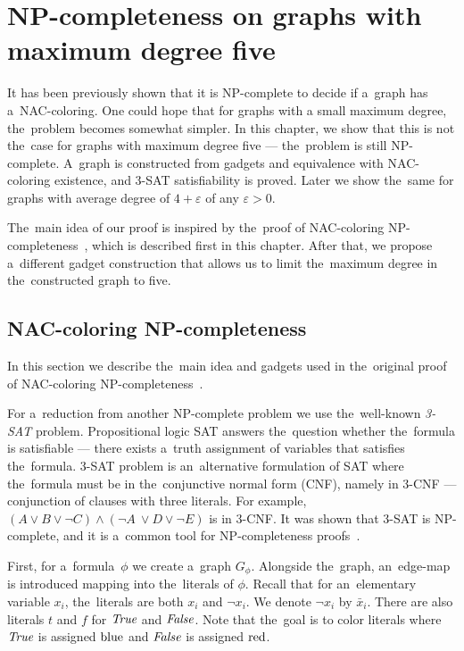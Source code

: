 \chapter{NP-completeness on graphs with maximum degree five}%
\label{chapter:np}

\begin{chapterabstract}

	It has been previously shown that it is NP-complete to decide
	if a~graph has a~NAC-coloring.
	One could hope that for graphs with a small maximum degree,
	the~problem becomes somewhat simpler.
	In this chapter, we show that this is not the~case
	for graphs with maximum degree five --- the~problem is still NP-complete.
	A~graph is constructed from gadgets and equivalence
	with NAC-coloring existence, and 3-SAT satisfiability is proved.
	Later we show the~same for graphs with average degree of
	$4+\varepsilon$ of any $\varepsilon > 0$.

\end{chapterabstract}

The~main idea of our proof is inspired by
the~proof of NAC-coloring NP-completeness~\cite{np_complete},
which is described first in this chapter.
After that, we propose a~different gadget construction
that allows us to limit the~maximum
degree in the~constructed graph to five.

\section{NAC-coloring NP-completeness}

In this section we describe the~main idea and gadgets used
in the~original proof of NAC-coloring NP-completeness~\cite{np_complete}.

For a~reduction from another NP-complete problem
we use the~well-known \emph{3-SAT} problem.
Propositional logic SAT answers the~question
whether the~formula is satisfiable ---
there exists a~truth assignment of variables that satisfies the~formula.
3-SAT problem is an~alternative formulation of SAT
where the~formula must be in the~conjunctive normal form (CNF), namely in 3-CNF
--- conjunction of clauses with three literals.
For example, \( (A \lor B \lor \lnot C) \land (\lnot A~\lor D \lor \lnot E) \)
is in 3-CNF\@.
It was shown that 3-SAT is NP-complete,
and it is a~common tool for NP-completeness proofs~\cite{3-sat}.

First, for a~formula~\( \phi \) we create a~graph \( G_\phi \).
Alongside the~graph, an~edge-map is introduced mapping into the~literals
of \( \phi \). Recall that for an~elementary variable \( x_i \), the~literals
are both \( x_i \) and \( \neg x_i \). We denote \( \lnot x_i \) by \( \bar{x}_i \).
There are also literals \( t \) and \( f \) for \( \textit{True} \) and \( \textit{False} \).
Note that the~goal is to color literals where \( \textit{True} \) is assigned \( \text{blue} \)
and \( \textit{False} \) is assigned \( \text{red} \).

